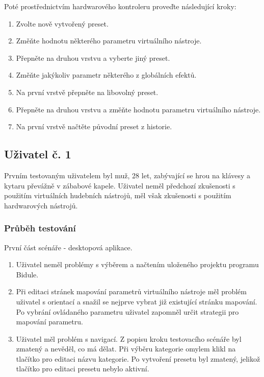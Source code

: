 \documentclass[thesis=M,czech]{FITthesis}[2019/03/06]
\begin{document}
			\noindent
			Poté prostřednictvím hardwarového kontroleru proveďte následující kroky:
			\begin{enumerate}
				\item Zvolte nově vytvořený preset.
				\item Změňte hodnotu některého parametru virtuálního nástroje.
				\item Přepněte na druhou vrstvu a vyberte jiný preset.
				\item Změňte jakýkoliv parametr některého z globálních efektů.
				\item Na první vrstvě přepněte na libovolný preset.
				\item Přepněte na druhou vrstvu a změňte hodnotu parametru virtuálního nástroje.
				\item Na první vrstvě načtěte původní preset z historie.
			\end{enumerate}
		
		\subsection{Uživatel č. 1}
			Prvním testovaným uživatelem byl muž, 28 let, zabývající se hrou na klávesy a kytaru převážně v zábabové kapele.
			Uživatel neměl předchozí zkušenosti s použitím virtuálních hudebních nástrojů, měl však zkušenosti s použitím hardwarových nástrojů.

			\subsubsection{Průběh testování}
			
			\noindent
			První část scénáře - desktopová aplikace.
			\begin{enumerate}
				\item Uživatel neměl problémy s výběrem a načtením uloženého projektu programu Bidule.
				\item Při editaci stránek mapování parametrů virtuálního nástroje měl problém uživatel s orientací a snažil se nejprve vybrat již existující stránku mapování. Po vybrání ovládaného parametru uživatel zapomněl určit strategii pro mapování parametru. 
				\item Uživatel měl problém s navigací. Z popisu kroku testovacího scénáře byl zmatený a nevěděl, co má dělat. Při výběru kategorie omylem klikl na tlačítko pro editaci názvu kategorie. Po vytvoření presetu byl zmatený, jelikož tlačítko pro editaci presetu nebylo aktivní.
			\end{enumerate}
		
\end{document}
